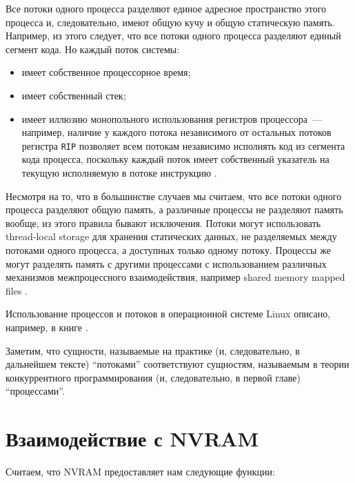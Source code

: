 \documentclass[times,specification,annotation]{itmo-student-thesis}
\begin{document}
Все потоки \cite{thread} одного процесса разделяют единое адресное пространство этого процесса и, следовательно, имеют общую кучу и общую статическую память. Например, из этого следует, что все потоки одного процесса разделяют единый сегмент кода. Но каждый поток системы:

\begin{itemize}
    \item имеет собственное процессорное время;
    
    \item имеет собственный стек;
    
    \item имеет иллюзию монопольного использования регистров процессора~--- например, наличие у каждого потока независимого от остальных потоков регистра \texttt{RIP} позволяет всем потокам независимо исполнять код из сегмента кода процесса, поскольку каждый поток имеет собственный указатель на текущую исполняемую в потоке инструкцию \cite{program-counter}.

\end{itemize}

\bigbreak

Несмотря на то, что в большинстве случаев мы считаем, что все потоки одного процесса разделяют общую память, а различные процессы не разделяют память вообще, из этого правила бывают исключения. Потоки могут использовать thread-local storage \cite{thread-local-storage} для хранения статических данных, не разделяемых между потоками одного процесса, а доступных только одному потоку. Процессы же могут разделять память с другими процессами с использованием различных механизмов межпроцессного взаимодействия, например shared memory mapped files \cite{mmap}.

Использование процессов и потоков в операционной системе Linux описано, например, в книге \cite{kerrisk}.

Заметим, что сущности, называемые на практике (и, следовательно, в дальнейшем тексте) ``потоками'' соответствуют сущностям, называемым в теории конкуррентного программирования (и, следовательно, в первой главе) ``процессами''.

\section{Взаимодействие с NVRAM}

Считаем, что NVRAM предоставляет нам следующие функции:
\end{document}
